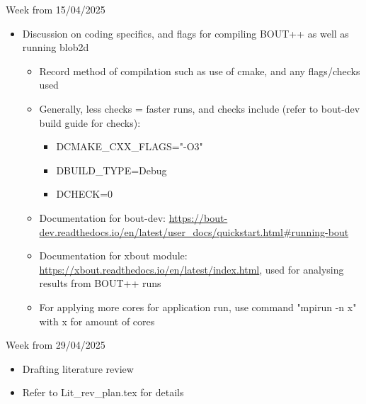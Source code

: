 \documentclass{article}
\begin{document}
\begin{arrowlist}
    \item Week from 15/04/2025
    \begin{itemize}
        \item Discussion on coding specifics, and flags for compiling BOUT++ as well as running blob2d
        \begin{itemize}
            \item Record method of compilation such as use of cmake, and any flags/checks used
            \item Generally, less checks = faster runs, and checks include (refer to bout-dev build guide for checks):
            \begin{itemize}
                \item DCMAKE\_CXX\_FLAGS="-O3"
                \item DBUILD\_TYPE=Debug
                \item DCHECK=0
            \end{itemize}
            \item Documentation for bout-dev: \url{https://bout-dev.readthedocs.io/en/latest/user_docs/quickstart.html#running-bout}
            \item Documentation for xbout module: \url{https://xbout.readthedocs.io/en/latest/index.html}, used for analysing results from BOUT++ runs
            \item For applying more cores for application run, use command "mpirun -n x" with x for amount of cores
        \end{itemize}
    \end{itemize}
    \item Week from 29/04/2025
       \begin{itemize}
            \item Drafting literature review\
            \item Refer to Lit\_rev\_plan.tex for details
       \end{itemize}
\end{arrowlist}
\end{document}

